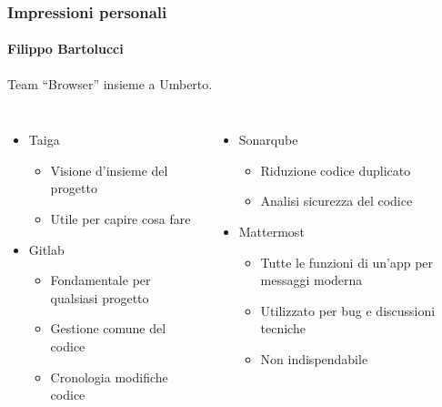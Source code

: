 \documentclass{beamer}
\begin{document}
\begin{frame}
\frametitle{Impressioni personali}
\framesubtitle{Filippo Bartolucci}
Team “Browser” insieme a Umberto.
\begin{columns}
\begin{itemize}
	\item Taiga
	\begin{itemize}
		\item Visione d’insieme del progetto
		\item Utile per capire cosa fare
	\end{itemize}
	\item Gitlab
	\begin{itemize}
		\item Fondamentale per qualsiasi progetto
		\item Gestione comune del codice
		\item Cronologia modifiche codice
	\end{itemize}
\end{itemize}
\begin{itemize}
	\item Sonarqube
	\begin{itemize}
		\item Riduzione codice duplicato
		\item Analisi sicurezza del codice
	\end{itemize}
	\item Mattermost
	\begin{itemize}
		\item Tutte le funzioni di un’app per messaggi moderna
		\item Utilizzato per bug e discussioni tecniche
		\item Non indispendabile
	\end{itemize}
\end{itemize}
\end{columns}
\end{frame}
\end{document}
